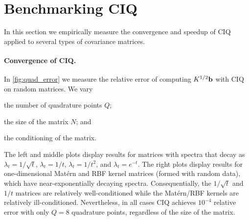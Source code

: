 
\section{Benchmarking CIQ}
\label{sec:ciq_empirical}

In this section we empirically measure the convergence and speedup of CIQ applied to several types of covariance matrices.

\paragraph{Convergence of CIQ.}
In \cref{fig:quad_error} we measure the relative error of computing $K^{1/2} \mathbf{b}$ with CIQ on random matrices.
We vary
%
\begin{enumerate*}
  \item the number of quadrature points $Q$;
  \item the size of the matrix $N$; and
  \item the conditioning of the matrix.
\end{enumerate*}
%
The left and middle plots display results for matrices with spectra that decay as $\lambda_t = 1 / \sqrt{t}$, $\lambda_t = 1/t$, $\lambda_t = 1 / t^2$, and $\lambda_t = e^{-t}$.
The right plots display results for one-dimensional Mat\'ern and RBF kernel matrices (formed with random data), which have near-exponentially decaying spectra.
Consequentially, the $1 / \sqrt{t}$ and $1 / t$ matrices are relatively well-conditioned while the Mat\'ern/RBF kernels are relatively ill-conditioned.
Nevertheless, in all cases CIQ achieves $10^{-4}$ relative error with only $Q=8$ quadrature points, regardless of the size of the matrix.

